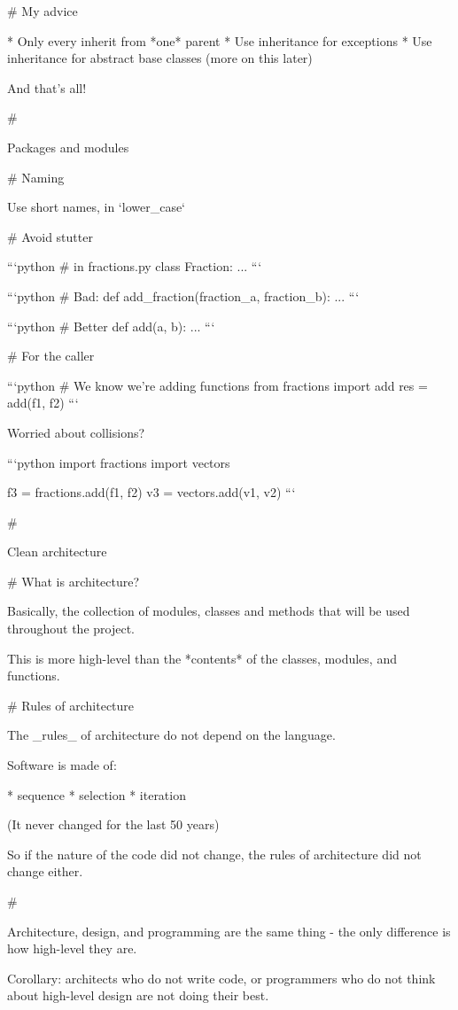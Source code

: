 #  My advice

* Only every inherit from *one* parent
* Use inheritance for exceptions
* Use inheritance for abstract base classes (more on this later)

\vfill

And that's all!

#

\huge \center Packages and modules

# Naming

Use short names, in `lower_case`


# Avoid stutter

```python
# in fractions.py
class Fraction:
    ...
```

```python
# Bad:
def add_fraction(fraction_a, fraction_b):
    ...
```

```python
# Better
def add(a, b):
    ...
```

# For the caller

```python
# We know we're adding functions
from fractions import add
res = add(f1, f2)
```

\vfill

Worried about collisions?

```python
import fractions
import vectors

f3 = fractions.add(f1, f2)
v3 = vectors.add(v1, v2)
```

#

\huge \center Clean architecture

# What is architecture?

Basically, the collection of modules, classes and methods that will
be used throughout the project.

This is more high-level than the *contents* of the classes, modules, and functions.


# Rules of architecture

The _rules_ of architecture do not depend on the language.

Software is made of:

* sequence
* selection
* iteration

(It never changed for the last 50 years)

So if the nature of the code did not change, the rules of architecture did
not change either.

#

Architecture, design, and programming are the same thing - the only difference
is how high-level they are.

Corollary: architects who do not write code, or programmers who do not think about
high-level design are not doing their best.

